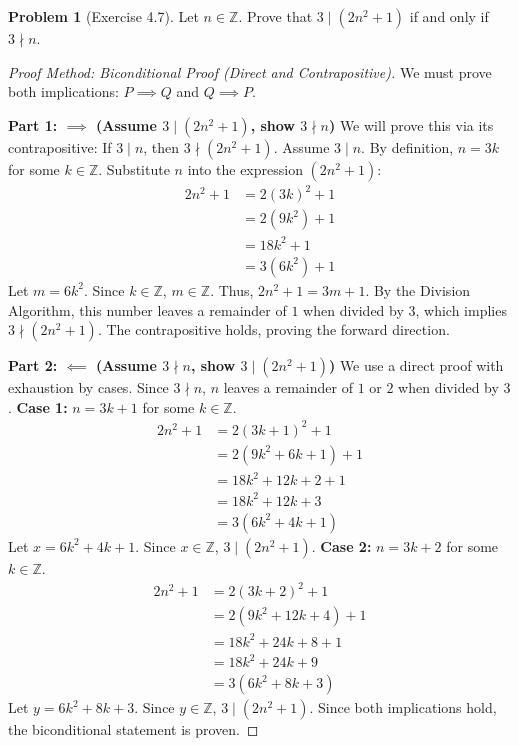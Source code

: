 \documentclass[11pt]{article}
\theoremstyle{definition}
\newtheorem{problem}{Problem}
\theoremstyle{remark}
\begin{document}
\begin{problem}[Exercise 4.7]
Let $n \in \mathbb{Z}$. Prove that $3 \mid (2n^2 + 1)$ if and only if $3 \nmid n$.
\end{problem}
\begin{proof}[Proof Method: Biconditional Proof (Direct and Contrapositive)]
We must prove both implications: $P \implies Q$ and $Q \implies P$.

\textbf{Part 1: $\implies$ (Assume $3 \mid (2n^2 + 1)$, show $3 \nmid n$)}
We will prove this via its contrapositive: If $3 \mid n$, then $3 \nmid (2n^2 + 1)$.
Assume $3 \mid n$. By definition, $n = 3k$ for some $k \in \mathbb{Z}$.
Substitute $n$ into the expression $(2n^2 + 1)$:
\begin{align*}
2n^2 + 1 &= 2(3k)^2 + 1 \\
&= 2(9k^2) + 1 \\
&= 18k^2 + 1 \\
&= 3(6k^2) + 1
\end{align*}
Let $m = 6k^2$. Since $k \in \mathbb{Z}$, $m \in \mathbb{Z}$. Thus, $2n^2 + 1 = 3m + 1$. By the Division Algorithm, this number leaves a remainder of $1$ when divided by $3$, which implies $3 \nmid (2n^2 + 1)$. The contrapositive holds, proving the forward direction.

\textbf{Part 2: $\impliedby$ (Assume $3 \nmid n$, show $3 \mid (2n^2 + 1)$)}
We use a direct proof with exhaustion by cases. Since $3 \nmid n$, $n$ leaves a remainder of $1$ or $2$ when divided by $3$.
\textbf{Case 1:} $n = 3k + 1$ for some $k \in \mathbb{Z}$.
\begin{align*}
2n^2 + 1 &= 2(3k + 1)^2 + 1 \\
&= 2(9k^2 + 6k + 1) + 1 \\
&= 18k^2 + 12k + 2 + 1 \\
&= 18k^2 + 12k + 3 \\
&= 3(6k^2 + 4k + 1)
\end{align*}
Let $x = 6k^2 + 4k + 1$. Since $x \in \mathbb{Z}$, $3 \mid (2n^2 + 1)$.
\textbf{Case 2:} $n = 3k + 2$ for some $k \in \mathbb{Z}$.
\begin{align*}
2n^2 + 1 &= 2(3k + 2)^2 + 1 \\
&= 2(9k^2 + 12k + 4) + 1 \\
&= 18k^2 + 24k + 8 + 1 \\
&= 18k^2 + 24k + 9 \\
&= 3(6k^2 + 8k + 3)
\end{align*}
Let $y = 6k^2 + 8k + 3$. Since $y \in \mathbb{Z}$, $3 \mid (2n^2 + 1)$.
Since both implications hold, the biconditional statement is proven.
\end{proof}
\end{document}
